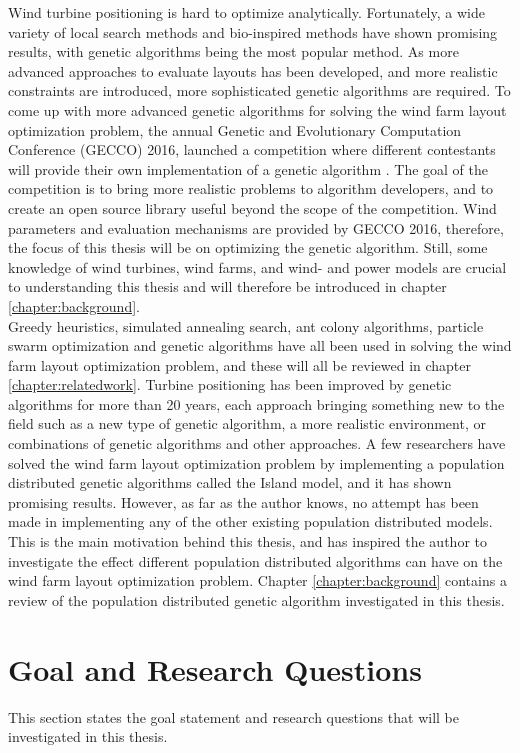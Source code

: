 \noindent Wind turbine positioning is hard to optimize analytically. Fortunately, a wide variety of local search methods and bio-inspired methods have shown promising results, with genetic algorithms being the most popular method. As more advanced approaches to evaluate layouts has been developed, and more realistic constraints are introduced, more sophisticated genetic algorithms are required. To come up with more advanced genetic algorithms for solving the wind farm layout optimization problem, the annual Genetic and Evolutionary Computation Conference (GECCO) 2016, launched a competition where different contestants will provide their own implementation of a genetic algorithm \citep{url2}. The goal of the competition is to bring more realistic problems to algorithm developers, and to create an open source library useful beyond the scope of the competition. Wind parameters and evaluation mechanisms are provided by GECCO 2016, therefore, the focus of this thesis will be on optimizing the genetic algorithm. Still, some knowledge of wind turbines, wind farms, and wind- and power models are crucial to understanding this thesis and will therefore be introduced in chapter \ref{chapter:background}. \\

\noindent Greedy heuristics, simulated annealing search, ant colony algorithms, particle swarm optimization and genetic algorithms have all been used in solving the wind farm layout optimization problem, and these will all be reviewed in chapter \ref{chapter:relatedwork}. Turbine positioning has been improved by genetic algorithms for more than 20 years, each approach bringing something new to the field such as a new type of genetic algorithm, a more realistic environment, or combinations of genetic algorithms and other approaches. A few researchers have solved the wind farm layout optimization problem by implementing a population distributed genetic algorithms called the Island model, and it has shown promising results. However, as far as the author knows, no attempt has been made in implementing any of the other existing population distributed models. This is the main motivation behind this thesis, and has inspired the author to investigate the effect different population distributed algorithms can have on the wind farm layout optimization problem. Chapter \ref{chapter:background} contains a review of the population distributed genetic algorithm investigated in this thesis.


\section{Goal and Research Questions}\label{section:goal&researchquestions}
This section states the goal statement and research questions that will be investigated in this thesis. \\

